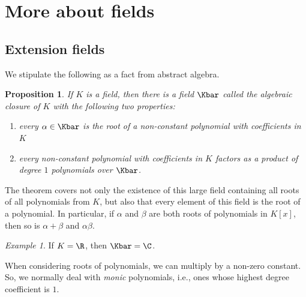 \documentclass[12pt]{amsart}
\theoremstyle{plain}
\newtheorem{prop}[thm]{Proposition}
\theoremstyle{definition}
\theoremstyle{remark}
\newtheorem*{exam}{Example}
\begin{document}
\section{More about fields}
\subsection{Extension fields}

We stipulate the following as a fact from abstract algebra.
\begin{prop}
  If $K$ is a field, then there is a field $\Kbar$ called the {\em
    algebraic closure of $K$} with the following two properties:
  \begin{enumerate}
  \item every $\alpha\in \Kbar$ is the root of a non-constant polynomial with
    coefficients in $K$
  \item every non-constant polynomial with coefficients in $K$ factors
    as a product of degree $1$ polynomials over $\Kbar$.
  \end{enumerate}
\end{prop}
The theorem covers not only the existence of this large field
containing all roots of all polynomials from $K$, but also that every
element of this field is the root of a polynomial.  In particular, if
$\alpha$ and $\beta$ are both roots of polynomials in $K[x]$, then so
is $\alpha+\beta$ and $\alpha\beta$.


\begin{exam}
  If $K=\R$, then $\Kbar=\C$.
\end{exam}

When considering roots of polynomials, we can multiply by a non-zero
constant.  So, we normally deal with \emph{monic} polynomials, i.e.,
ones whose highest degree coefficient is $1$.
\end{document}
